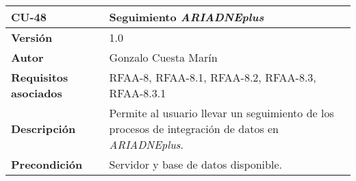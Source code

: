 \begin{longtable}[]{@{}ll@{}}
\toprule
\begin{minipage}[b]{0.20\columnwidth}\raggedright
\textbf{CU-48}\strut
\end{minipage} & \begin{minipage}[b]{0.74\columnwidth}\raggedright
\textbf{Seguimiento \emph{ARIADNEplus}}\strut
\end{minipage}\tabularnewline
\midrule
\endhead
\begin{minipage}[t]{0.20\columnwidth}\raggedright
\textbf{Versión}\strut
\end{minipage} & \begin{minipage}[t]{0.74\columnwidth}\raggedright
1.0\strut
\end{minipage}\tabularnewline
\begin{minipage}[t]{0.20\columnwidth}\raggedright
\textbf{Autor}\strut
\end{minipage} & \begin{minipage}[t]{0.74\columnwidth}\raggedright
Gonzalo Cuesta Marín\strut
\end{minipage}\tabularnewline
\begin{minipage}[t]{0.20\columnwidth}\raggedright
\textbf{Requisitos asociados}\strut
\end{minipage} & \begin{minipage}[t]{0.74\columnwidth}\raggedright
RFAA-8, RFAA-8.1, RFAA-8.2, RFAA-8.3, RFAA-8.3.1\strut
\end{minipage}\tabularnewline
\begin{minipage}[t]{0.20\columnwidth}\raggedright
\textbf{Descripción}\strut
\end{minipage} & \begin{minipage}[t]{0.74\columnwidth}\raggedright
Permite al usuario llevar un seguimiento de los procesos de integración
de datos en \emph{ARIADNEplus}.\strut
\end{minipage}\tabularnewline
\begin{minipage}[t]{0.20\columnwidth}\raggedright
\textbf{Precondición}\strut
\end{minipage} & \begin{minipage}[t]{0.74\columnwidth}\raggedright
Servidor y base de datos disponible.


\end{minipage}
\end{longtable}
